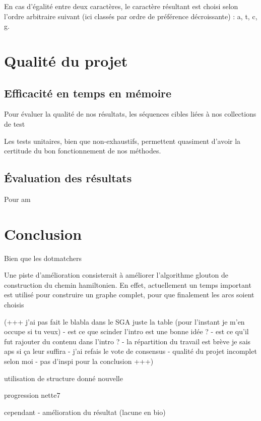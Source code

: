 \documentclass{article}
\begin{document}
En cas d'égalité entre deux caractères, le caractère résultant est choisi selon l'ordre arbitraire suivant (ici classés par ordre de préférence décroissante) : a, t, c, g.

\section{Qualité du projet}

\subsection{Efficacité en temps en mémoire}
Pour évaluer la qualité de nos résultats, les séquences cibles liées à nos collections de test 

Les tests unitaires, bien que non-exhaustifs, permettent quasiment d'avoir la certitude du bon fonctionnement de nos méthodes.

\subsection{\'Evaluation des résultats}

Pour am


\section{Conclusion}

Bien que les dotmatchers


Une piste d'amélioration consisterait à améliorer l'algorithme glouton de construction du chemin hamiltonien. En effet, actuellement un temps important est utilisé pour construire un graphe complet, pour que finalement les arcs soient choisis 

(+++ j'ai pas fait le blabla dans le SGA juste la table (pour l'instant je m'en occupe si tu veux)  - est ce que scinder l'intro est une bonne idée ? - est ce qu'il fut rajouter du contenu dans l'intro ? -  la répartition du travail est brève je sais aps si ça leur suffira -  j'ai refais le vote de consensus -  qualité du projet incomplet selon moi - pas d'inspi pour la conclusion +++)

utilisation de structure donné nouvelle

progression nette7

cependant - amélioration du résultat (lacune en bio)
\end{document}
